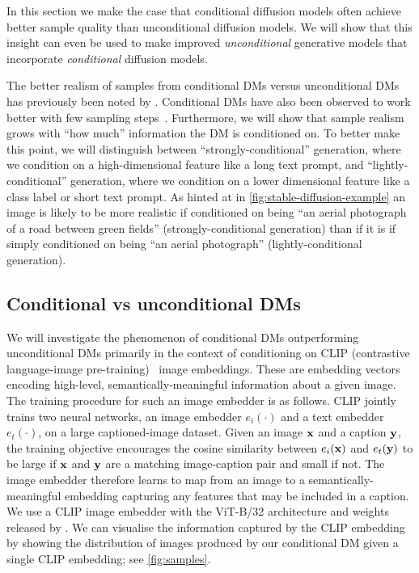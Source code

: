 In this section we make the case that conditional diffusion models often achieve better sample quality than unconditional diffusion models. We will show that this insight can even be used to make improved \textit{unconditional} generative models that incorporate \textit{conditional} diffusion models.

The better realism of samples from conditional DMs versus unconditional DMs has previously been noted by \citet{ho2022classifier,bao2022conditional,hu2022self}. Conditional DMs have also been observed to work better with few sampling steps~\citep{meng2022distillation}. Furthermore, we will show that sample realism grows with ``how much'' information the DM is conditioned on. To better make this point, we will distinguish between ``strongly-conditional'' generation, where we condition on a high-dimensional feature like a long text prompt, and ``lightly-conditional'' generation, where we condition on a lower dimensional feature like a class label or short text prompt.  As hinted at in \cref{fig:stable-diffusion-example} an image is likely to be more realistic if conditioned on being ``an aerial photograph of a road between green fields'' (strongly-conditional generation) than if it is if simply conditioned on being ``an aerial photograph'' (lightly-conditional generation). 

\subsection{Conditional vs unconditional DMs} \label{sec:2sdm-cond-vs-uncond-dgms}

We will investigate the phenomenon of conditional DMs outperforming unconditional DMs primarily in the context of conditioning on CLIP (contrastive language-image pre-training)~\citep{radford2021learning} image embeddings. These are embedding vectors encoding high-level, semantically-meaningful information about a given image. The training procedure for such an image embedder is as follows. CLIP jointly trains two neural networks, an image embedder $e_i(\cdot)$ and a text embedder $e_t(\cdot)$, on a large captioned-image dataset. Given an image ${\mathbf{x}}$ and a caption ${\mathbf{y}}$, the training objective encourages the cosine similarity between $e_i({\mathbf{x}})$ and $e_t({\mathbf{y}})$ to be large if ${\mathbf{x}}$ and ${\mathbf{y}}$ are a matching image-caption pair and small if not.
The image embedder therefore learns to map from an image to a semantically-meaningful embedding capturing any features that may be included in a caption. We use a CLIP image embedder with the ViT-B/32 architecture and weights released by \citet{radford2021learning}. We can visualise the information captured by the CLIP embedding by showing the distribution of images produced by our conditional DM given a single CLIP embedding; see \cref{fig:samples}.

